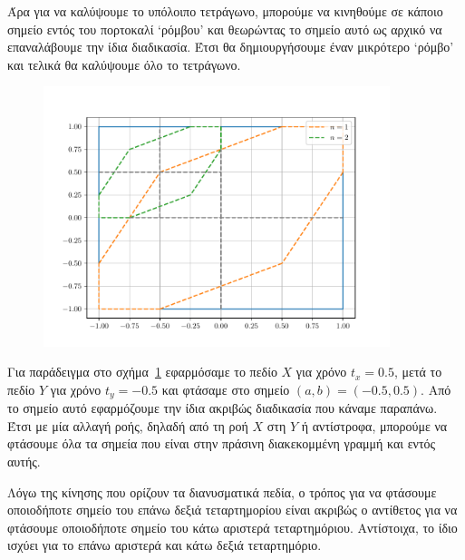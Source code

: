 \begin{solution}
    Άρα για να καλύψουμε το υπόλοιπο τετράγωνο, μπορούμε να κινηθούμε σε κάποιο
    σημείο εντός του πορτοκαλί \enquote*{ρόμβου} και θεωρώντας το σημείο αυτό ως
    αρχικό να επαναλάβουμε την ίδια διαδικασία. Έτσι θα δημιουργήσουμε έναν
    μικρότερο \enquote*{ρόμβο} και τελικά θα καλύψουμε όλο το τετράγωνο.
    \begin{figure}[h]
        \centering
        \includegraphics[width=0.9\textwidth]{figures/ex8_rhombus2.pdf}
        \caption{}
        \label{fig:ex8_rhombus2}
    \end{figure}
    Για παράδειγμα στο σχήμα~\ref{fig:ex8_rhombus2} εφαρμόσαμε το πεδίο \( X \)
    για χρόνο \( t_x = 0.5 \), μετά το πεδίο \( Y \) για χρόνο \( t_y = -0.5 \)
    και φτάσαμε στο σημείο \( (a, b) = (-0.5, 0.5) \). Από το σημείο αυτό
    εφαρμόζουμε την ίδια ακριβώς διαδικασία που κάναμε παραπάνω. Έτσι με μία
    αλλαγή ροής, δηλαδή από τη ροή \( X \) στη \( Y \) ή αντίστροφα, μπορούμε να
    φτάσουμε όλα τα σημεία που είναι στην πράσινη διακεκομμένη γραμμή και εντός
    αυτής.

    Λόγω της κίνησης που ορίζουν τα διανυσματικά πεδία, ο τρόπος για να φτάσουμε
    οποιοδήποτε σημείο του επάνω δεξιά τεταρτημορίου είναι ακριβώς ο αντίθετος
    για να φτάσουμε οποιοδήποτε σημείο του κάτω αριστερά τεταρτημόριου.
    Αντίστοιχα, το ίδιο ισχύει για το επάνω αριστερά και κάτω δεξιά
    τεταρτημόριο.


\end{solution}
